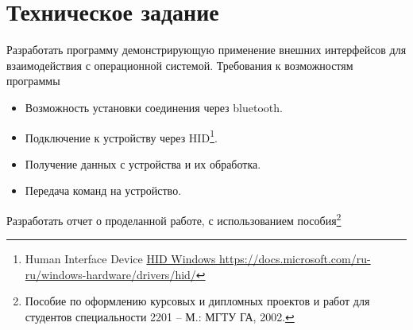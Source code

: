 \section{Техническое задание}

Разработать программу демонстрирующую применение внешних интерфейсов для взаимодействия с операционной системой.
Требования к возможностям программы
\begin{itemize}
    \item Возможность установки соединения через bluetooth. \\
    \item Подключение к устройству через HID\footnote{Human Interface Device \href{https://docs.microsoft.com/ru-ru/windows-hardware/drivers/hid/}{HID Windows https://docs.microsoft.com/ru-ru/windows-hardware/drivers/hid/}}\@.
    \item Получение данных с устройства и их обработка.
    \item Передача команд на устройство.
\end{itemize}
Разработать отчет о проделанной работе, с использованием пособия\footnote{Пособие по оформлению курсовых и дипломных проектов и работ для студентов специальности 2201 – М.: МГТУ ГА, 2002.}
\newpage